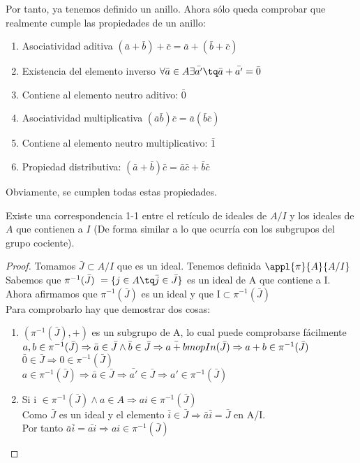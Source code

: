 \documentclass[nochap]{apuntes}
\begin{document}
Por tanto, ya tenemos definido un anillo. Ahora sólo queda comprobar que realmente cumple las propiedades de un anillo:
\begin{enumerate}
 \item Asociatividad aditiva $(\bar{a}+\bar{b})+\bar{c}=\bar{a}+(\bar{b}+\bar{c})$
 \item Existencia del elemento inverso $\forall \bar{a} \in A \exists \bar{a'} \tq \bar{a}+\bar{a'}=\bar{0}$
 \item Contiene al elemento neutro aditivo: $\bar{0}$
 \item Asociatividad multiplicativa $(\bar{a}\bar{b})\bar{c}=\bar{a}(\bar{b}\bar{c})$
 \item Contiene al elemento neutro multiplicativo: $\bar{1}$
 \item Propiedad distributiva: $(\bar{a}+\bar{b})\bar{c}=\bar{a}\bar{c}+\bar{b}\bar{c}$
\end{enumerate}
Obviamente, se cumplen todas estas propiedades.

\begin{lemma}
 Existe una correspondencia 1-1 entre el retículo de ideales de $A/I$ y los ideales de $A$ que contienen a $I$ (De forma similar a lo que ocurría con los subgrupos del grupo cociente).
\end{lemma}
\begin{proof}
 Tomamos $\bar{J}\subset A/I$  que es un ideal. Tenemos definida $\appl{\pi}{A}{A/I}$\\
 Sabemos que $\pi^{-1}(\bar{J})\  =\{j \in A \tq \bar{j} \in \bar{J}\}$  es un ideal de A que contiene a I.\\
 Ahora afirmamos que $\pi^{-1}(\bar{J})$  es un ideal y que I$\subset \pi^{-1}(\bar{J})$\\
 Para comprobarlo hay que demostrar dos cosas:
 \begin{enumerate}
  \item $(\pi^{-1}(\bar{J}), + )$  es un subgrupo de A, lo cual puede comprobarse fácilmente\\
  $a,b \in \pi^{-1}(\bar{J}) \Rightarrow \bar{a}\in \bar{J} \wedge \bar{b}\in\bar{J}  \Rightarrow  \bar{a+b} \\mop{In}(\bar{J}) \Rightarrow a+b \in \pi^{-1}(\bar{J})$\\
  $\bar{0} \in \bar{J} \Rightarrow 0 \in \pi^{-1}(\bar{J})$\\
  $a \in \pi^{-1}(\bar{J}) \Rightarrow \bar{a} \in \bar{J} \Rightarrow \bar{a'}\in \bar{J} \Rightarrow a' \in \pi^{-1}(\bar{J})$\\
  \item Si i $\in\pi^{-1}(\bar{J}) \wedge a \in A \Rightarrow ai\in \pi^{-1}(\bar{J})$\\
  Como $\bar{J}$  es un ideal y el elemento $\bar{i}\in\bar{J} \Rightarrow \bar{a}\bar{i}=\bar{J}$  en A/I.\\
  Por tanto $\bar{a}\bar{i}=\bar{ai} \Rightarrow  ai \in \pi^{-1}(\bar{J})$\\
  \end{enumerate}
\end{proof}
\end{document}
